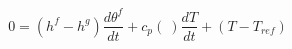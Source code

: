 \begin{equation}
0= (h^f-h^g) \frac{d\theta^f }{dt} + c_p(\ ) \frac{d T}{dt} +  (T- T_{ref})
\end{equation}
